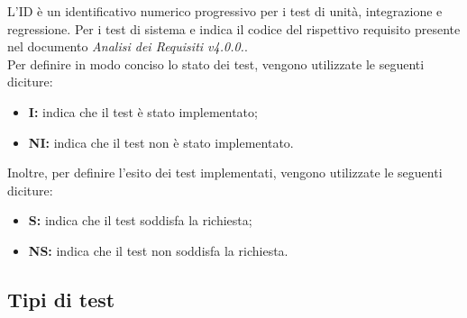 L'ID è un identificativo numerico progressivo per i test di unità, integrazione e regressione. Per i test di sistema e
indica il codice del rispettivo requisito presente nel documento \textit{Analisi dei Requisiti v4.0.0.}.\\
Per definire in modo conciso lo stato dei test, vengono utilizzate le seguenti diciture:
\begin{itemize}
    \item \textbf{I:} indica che il test è stato implementato;
    \item \textbf{NI:} indica che il test non è stato implementato.
\end{itemize}
Inoltre, per definire l'esito dei test implementati, vengono utilizzate le seguenti diciture:
\begin{itemize}
    \item \textbf{S:} indica che il test soddisfa la richiesta;
    \item \textbf{NS:} indica che il test non soddisfa la richiesta.
\end{itemize}
\pagebreak
\subsection{Tipi di test}
